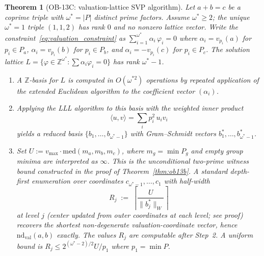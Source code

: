 \documentclass[12pt]{article}
\newtheorem{theorem}{Theorem}
\theoremstyle{definition}
\begin{document}
\begin{theorem}[OB-13C: valuation-lattice SVP algorithm]\label{thm:ob13c}
Let $a + b = c$ be a coprime triple with $\omega^* = |P|$ distinct prime factors.
Assume $\omega^*\ge2$; the unique $\omega^*=1$ triple $(1,1,2)$ has rank $0$
and no nonzero lattice vector.
Write the constraint~\eqref{eq:valuation_constraint} as $\sum_{i=1}^{\omega^*} \alpha_i\,\varphi_i = 0$ where
$\alpha_i = v_{p_i}(a)$ for $p_i \in P_a$, $\alpha_i = v_{p_i}(b)$ for $p_i \in P_b$,
and $\alpha_i = -v_{p_i}(c)$ for $p_i \in P_c$.  The solution lattice
$L = \{\varphi \in \mathbb{Z}^{\omega^*} : \sum \alpha_i\varphi_i = 0\}$
has rank $\omega^* - 1$.

\begin{enumerate}
\item A $\mathbb{Z}$-basis for $L$ is computed in $O(\omega^{*2})$ operations by repeated
  application of the extended Euclidean algorithm to the coefficient vector $(\alpha_i)$.
\item Applying the LLL algorithm to this basis with the weighted inner product
\[
  \langle u, v\rangle = \sum_i p_i^2\, u_i v_i
\]
  yields a reduced basis $\{b_1,\ldots,b_{\omega^*-1}\}$
  with Gram--Schmidt vectors $b_1^*,\ldots,b_{\omega^*-1}^*$.
\item Set $U := v_{\max} \cdot \mathrm{med}(m_a,m_b,m_c)$, where $m_g=\min P_g$
  and empty group minima are interpreted as $\infty$.  This is the
  unconditional two-prime witness bound constructed in the proof of
  Theorem~\ref{thm:ob13b}.  A standard depth-first enumeration over coordinates
  $c_{\omega^*-1},\ldots,c_1$ with half-width
  \[
    R_j \;:=\; \left\lceil \frac{U}{\|b_j^*\|_W} \right\rceil
  \]
  at level $j$ (center updated from outer coordinates at each level; see proof)
  recovers the shortest non-degenerate valuation-coordinate vector, hence
  $\mathrm{nd}_{\mathrm{val}}(a,b)$ exactly.
  The values $R_j$ are computable after Step~2.
  A uniform bound is $R_j \le 2^{(\omega^*-2)/2} U / p_1$
  where $p_1 = \min P$.
\end{enumerate}
\end{theorem}
\end{document}
